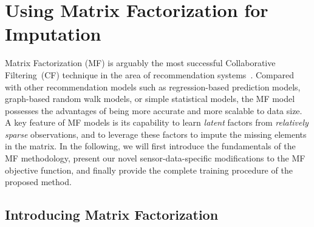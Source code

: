 \section{Using Matrix Factorization for Imputation}  \label{sec:mf}


Matrix Factorization (MF) is arguably the most successful Collaborative Filtering~(CF) technique in the area of recommendation systems~\cite{koren2009matrix, chen2011linear}. Compared with other recommendation models such as regression-based prediction models, graph-based random walk models, or simple statistical models, the MF model possesses the advantages of being more accurate and more scalable to data size.
A key feature of MF models is its capability to learn {\em latent} factors from {\em relatively sparse} observations, and to leverage these factors to impute the missing elements in the matrix.
In the following, we will first introduce the fundamentals of the MF methodology, present our novel sensor-data-specific 
modifications to the MF objective function, and finally provide the complete training procedure of the proposed method.

\subsection{Introducing Matrix Factorization}

